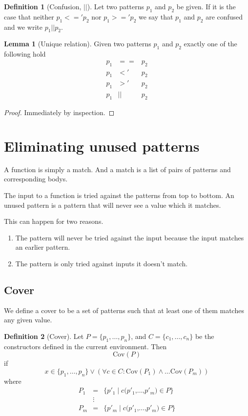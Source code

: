 \documentclass[a4paper, oneside, draft]{memoir}
\theoremstyle{definition}
\newtheorem{definition}{Definition}
\newtheorem{lemma}{Lemma}
\newcommand{\Cov}{\mathrm{Cov}}
\begin{document}
\begin{definition}[Confusion, $||$]\label{def:pat-confusion}
  Let two patterns $p_1$ and $p_2$ be given. If it is the case that neither $p_1
  <=' p_2$ nor $p_1 >=' p_2$ we say that $p_1$ and $p_2$ are confused and we
  write $p_1 || p_2$.
\end{definition}

\begin{lemma}[Unique relation]\label{lem:unique-rel}
  Given two patterns $p_1$ and $p_2$ exactly one of the following hold
  \begin{eqnarray*}
    p_1 &==& p_2\\
    p_1 &<'& p_2\\
    p_1 &>'& p_2\\
    p_1 &||& p_2
  \end{eqnarray*}
\end{lemma}
\begin{proof}
  Immediately by inspection.
\end{proof}

\section{Eliminating unused patterns}
A function is simply a match. And a match is a list of pairs of patterns and
corresponding bodys.

The input to a function is tried against the patterns from top to bottom. An
unused pattern is a pattern that will never see a value which it matches.

This can happen for two reasons.
\begin{enumerate}
\item The pattern will never be tried against the input because the input
  matches an earlier pattern. \label{item:unused-reason-1}
\item The pattern is only tried against inputs it doesn't match. \label{item:unused-reason-2}
\end{enumerate}

\subsection{Cover}\label{sec:cover}
We define a cover to be a set of patterns such that at least one of them matches
any given value.

\begin{definition}[Cover]\label{def:cover}
  Let $P = \{p_1, \ldots, p_n \}$, and $C = \{c_1, \ldots, c_n\}$ be the constructors
  defined in the current environment. Then
  \[
  \Cov(P)
  \]
  if
  \[
  x \in \{p_1, \ldots, p_n \} \lor (\forall c \in C : \Cov(P_1) \land
  \ldots \Cov(P_m))
  \]
  where
  \begin{eqnarray*}
    P_1 &=& \{p'_1 \mid c \texttt{(} p'_1 \texttt{,} \ldots \texttt{,} p'_m \texttt{)} \in P\}\\
    &\vdots&\\
    P_m &=& \{p'_m \mid c \texttt{(} p'_1 \texttt{,} \ldots \texttt{,} p'_m \texttt{)} \in P\}
  \end{eqnarray*}
\end{definition}
\end{document}
